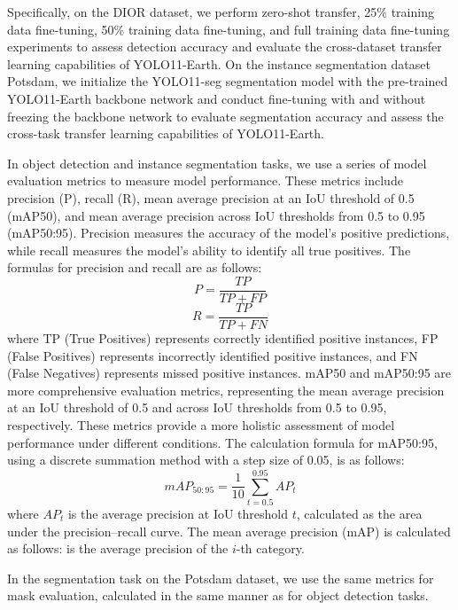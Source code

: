 \documentclass{article}
\begin{document}
Specifically, on the DIOR dataset, we perform zero-shot transfer, 25\% training  
data fine-tuning, 50\% training data fine-tuning, and full training data  
fine-tuning experiments to assess detection accuracy and evaluate the  
cross-dataset transfer learning capabilities of YOLO11-Earth. On the instance  
segmentation dataset Potsdam, we initialize the YOLO11-seg segmentation model  
with the pre-trained YOLO11-Earth backbone network and conduct fine-tuning  
with and without freezing the backbone network to evaluate segmentation  
accuracy and assess the cross-task transfer learning capabilities of  
YOLO11-Earth.  

In object detection and instance segmentation tasks, we use a series of model  
evaluation metrics to measure model performance. These metrics include  
precision (P), recall (R), mean average precision at an IoU threshold of 0.5  
(mAP50), and mean average precision across IoU thresholds from 0.5 to 0.95  
(mAP50:95). Precision measures the accuracy of the model’s positive  
predictions, while recall measures the model’s ability to identify all true  
positives. The formulas for precision and recall are as follows:
\begin{equation}
    P= \frac{TP}{TP+FP}
\end{equation}
\begin{equation}
    R= \frac{TP}{TP+FN}
\end{equation}
where TP (True Positives) represents correctly identified positive instances, 
FP (False Positives) represents incorrectly identified positive instances, 
and FN (False Negatives) represents missed positive instances. 
mAP50 and mAP50:95 are more comprehensive evaluation metrics, 
representing the mean average precision at an IoU threshold of 0.5 
and across IoU thresholds from 0.5 to 0.95, respectively. 
These metrics provide a more holistic assessment of model performance 
under different conditions. 
The calculation formula for mAP50:95, using a discrete summation method 
with a step size of 0.05, is as follows:
\begin{equation}
    mAP_{50:95}= \frac{1}{10}\sum _{t=0.5}^{0.95}AP_{t}
\end{equation}
where $AP_{t}$ is the average precision at IoU threshold $t$, 
calculated as the area under the precision–recall curve.
The mean average precision (mAP) is calculated as follows:
is the average precision of the $i$-th category.

In the segmentation task on the Potsdam dataset, 
we use the same metrics for mask evaluation, 
calculated in the same manner as for object detection tasks.
\end{document}
